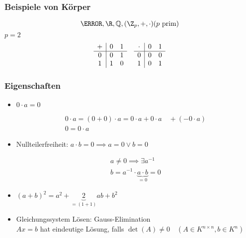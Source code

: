 \subsubsection{Beispiele von Körper}
\[ \C , \R , \Q , ( \Z_p , + , \cdot ) (p \text{ prim}) \]
$p=2$
\begin{gather*}
	\begin{array}{ c | c c }
		+	&0	&1	\\ \hline
		0	&0	&1	\\
		1	&1	&0	
	\end{array} \quad \begin{array}{ c | c c }
		\cdot	&0	&1	\\ \hline
		0	&0	&0	\\
		1	&0	&1	
	\end{array}
\end{gather*}

\subsubsection{Eigenschaften}
\begin{itemize}
	\item $0 \cdot a = 0$ \\
		\begin{bew}
			\begin{gather*}
				0 \cdot a = (0+0) \cdot a = 0 \cdot a + 0 \cdot a \quad + (-0 \cdot a) \\
				0 = 0 \cdot a
			\end{gather*}
		\end{bew}
	\item Nullteilerfreiheit: $a \cdot b = 0 \implies a = 0 \vee b = 0$ \\
		\begin{bew}
			\begin{gather*}
				a \neq 0 \implies \exists a^{-1} \\
				b = a^{-1} \cdot \underbrace{a \cdot b}_{=0} = 0
			\end{gather*}
		\end{bew}
	\item $(a+b)^2 = a^2 + \underbrace{2}_{=(1+1)}ab + b^2$
	\item Gleichungssystem Lösen: Gauss-Elimination \\
		$Ax = b$ hat eindeutige Lösung, falls $\det(A) \neq 0 \quad (A \in K^{n \times n} , b \in K^n)$
\end{itemize}

